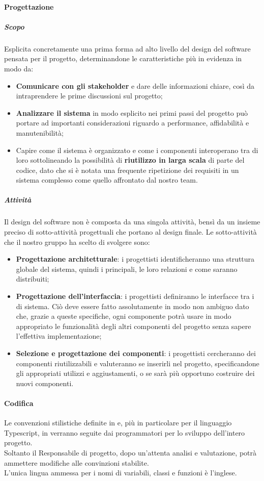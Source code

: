 \paragraph{Progettazione}
\subparagraph{Scopo}\Spazio
Esplicita concretamente una prima forma ad alto livello del design del software pensata per il progetto, determinandone le caratteristiche più in evidenza in modo da:
	\begin{itemize}
	\item \textbf{{Comunicare con gli stakeholder}} e dare delle informazioni chiare, così da intraprendere le prime discussioni sul progetto;
	\item \textbf{{Analizzare il sistema}} in modo esplicito nei primi passi del progetto può portare ad importanti considerazioni riguardo a performance, affidabilità e manutenibilità;
	\item Capire come il sistema è organizzato e come i componenti interoperano tra di loro sottolineando la possibilità di \textbf{{riutilizzo in larga scala}} di parte del codice, dato che si è notata una frequente ripetizione dei requisiti in un sistema complesso come quello affrontato dal nostro team.  	
	\end{itemize} 	
\subparagraph{Attività}\Spazio
Il design del software non è composta da una singola attività, bensì da un insieme preciso di sotto-attività progettuali che portano al design finale.
Le sotto-attività che il nostro gruppo ha scelto di svolgere sono:
	\begin{itemize}
	\item\textbf{{Progettazione architetturale}}: i progettisti identificheranno una struttura globale del sistema, quindi i  principali, le loro relazioni e come saranno distribuiti;
	\item\textbf{{Progettazione dell'interfaccia}}: i progettisti definiranno le interfacce tra i  di sistema. Ciò deve essere fatto assolutamente in modo non ambiguo dato che, grazie a queste specifiche, ogni componente potrà usare in modo appropriato le funzionalità degli altri componenti del progetto senza sapere l'effettiva implementazione;
	\item\textbf{{Selezione e progettazione dei componenti}}: i progettisti cercheranno dei componenti riutilizzabili e valuteranno se inserirli nel progetto, specificandone gli appropriati utilizzi e aggiustamenti, o se sarà più opportuno costruire dei nuovi componenti.
\end{itemize}
\paragraph{Codifica}\Spazio
Le convenzioni stilistiche definite in  e, più in particolare per il linguaggio Typescript, in  verranno seguite dai programmatori per lo sviluppo dell'intero progetto. \\
Soltanto il Responsabile di progetto, dopo un'attenta analisi e valutazione, potrà ammettere modifiche alle convinzioni stabilite.\\
L’unica lingua ammessa per i nomi di variabili, classi e funzioni è l’inglese.

